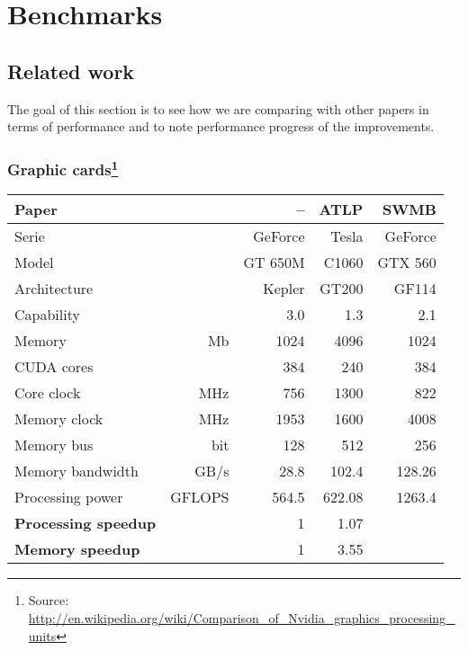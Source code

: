 \newpage
\section{Benchmarks}
\subsection{Related work}
The goal of this section is to see how we are comparing with other papers in terms of performance and to note performance progress of the improvements.

\subsubsection*{Graphic cards\footnote{Source: \url{http://en.wikipedia.org/wiki/Comparison_of_Nvidia_graphics_processing_units}}}
\def\unt#1{& \footnotesize #1}
\begin{center}\begin{tabular}{lrrrr} \toprule
\bf Paper		&				& \bf -- 		& \bf  ATLP\cite{gpu_atlp} & \bf SWMB\cite{swat_mega} \\ \midrule
Serie		&				& GeForce	& Tesla	& GeForce  \\
Model		&				& GT 650M	& C1060	& GTX 560 \\
Architecture	&				& Kepler		& GT200	& GF114 \\
Capability		&				& 3.0		& 1.3	& 2.1 \\
Memory \unt{Mb}				& 1024		& 4096	& 1024 \\
CUDA cores &					& 384		& 240	& 384 \\
Core clock \unt{MHz}			& 756		& 1300	& 822 \\
Memory clock \unt{MHz}			& 1953		& 1600	& 4008 \\
Memory bus \unt{bit}				& 128		& 512	& 256 \\
Memory bandwidth \unt{GB/s}		& 28.8		& 102.4	& 128.26 \\
Processing power \unt{GFLOPS}	&564.5		& 622.08	& 1263.4 \\ \midrule
\bf Processing speedup & 		& 1			& 1.07	& \\
\bf Memory speedup & 			& 1			& 3.55	& \\ \bottomrule
\end{tabular}\end{center}

